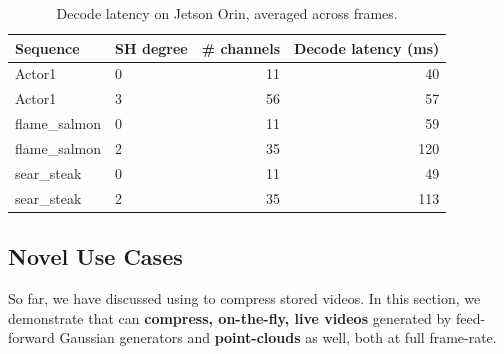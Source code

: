 \begin{table}[t]
  \centering
  \begin{tabular}{l|l|r|r}
    \hline
    \textbf{Sequence} & \textbf{SH degree} & \textbf{\# channels} & \textbf{Decode latency (ms)}\\
    \hline\hline
    Actor1         & 0 & 11 & 40 \\
    Actor1         & 3 & 56 & 57 \\
    flame\_salmon  & 0 & 11 & 59 \\
    flame\_salmon  & 2 & 35 & 120 \\
    sear\_steak    & 0 & 11 & 49 \\
    sear\_steak    & 2 & 35 & 113 \\
    \hline
  \end{tabular}
  \caption{Decode latency on Jetson Orin, averaged across frames.}
  \label{tab:jetson-decode}
\end{table}

\subsection{Novel \gsnfs{} Use Cases}\label{sec:other-capabilities}


So far, we have discussed using \gsnfs{} to compress stored \dgs{} videos.
%
In this section, we demonstrate that \gsnfs{} can \textbf{compress, on-the-fly, live \dgs{} videos} generated by feed-forward Gaussian generators and \textbf{point-clouds} as well, both at full frame-rate.
%

